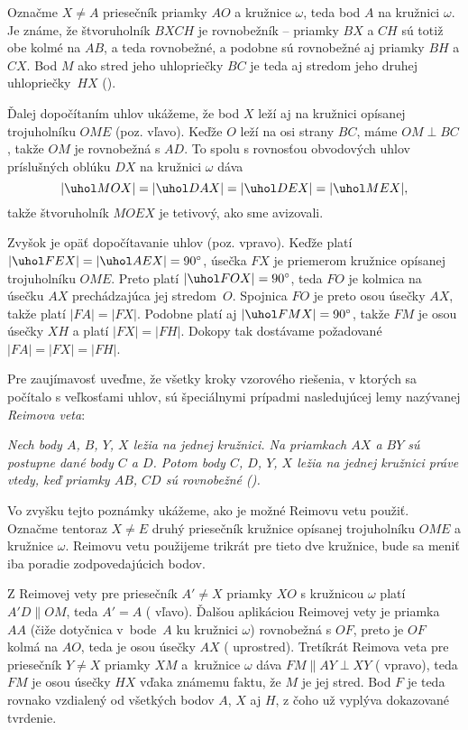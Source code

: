 {%
Označme $X\ne A$ priesečník priamky $AO$ a kružnice $\omega$, teda bod  $A$ na kružnici $\omega$. Je známe, že štvoruholník $BXCH$ je rovnobežník -- priamky $BX$ a $CH$ sú totiž obe kolmé na $AB$, a teda rovnobežné, a podobne sú rovnobežné aj priamky $BH$ a $CX$. Bod $M$ ako stred jeho uhlopriečky $BC$ je teda aj stredom jeho druhej uhlopriečky~$HX$ (\obr).
%

Ďalej dopočítaním uhlov ukážeme, že bod $X$ leží aj na kružnici opísanej trojuholníku $OME$ (poz. \obr{} vľavo). Keďže $O$ leží na osi strany $BC$, máme $OM\perp BC$, takže $OM$ je rovnobežná s $AD$. To spolu s rovnosťou obvodových uhlov príslušných oblúku $DX$ na kružnici $\omega$ dáva
$$|\uhol MOX|=|\uhol DAX|=|\uhol DEX|=|\uhol MEX|,$$
takže štvoruholník $MOEX$ je tetivový, ako sme avizovali.
%

Zvyšok je opäť dopočítavanie uhlov (poz.  vpravo). Keďže platí $|\uhol FEX|=|\uhol AEX|=90^\circ$, úsečka $FX$ je priemerom kružnice opísanej trojuholníku $OME$.
Preto platí $|\uhol FOX|=90^\circ$, teda $FO$ je kolmica na úsečku $AX$ prechádzajúca jej stredom~$O$. Spojnica $FO$ je preto osou úsečky $AX$, takže platí $|FA|=|FX|$.
Podobne platí aj $|\uhol FMX|=90^\circ$, takže $FM$ je osou úsečky $XH$ a platí $|FX|=|FH|$.
Dokopy tak dostávame požadované $|FA|=|FX|=|FH|$.

\poznamka
Pre zaujímavosť uveďme, že všetky kroky vzorového riešenia, v ktorých sa počítalo s veľkosťami uhlov, sú špeciálnymi prípadmi nasledujúcej lemy nazývanej \emph{Reimova veta}:

{\sl\it Nech body $A$, $B$, $Y$, $X$ ležia na jednej kružnici. Na priamkach $AX$ a $BY$ sú postupne dané body $C$ a $D$. Potom body $C$, $D$, $Y$, $X$ ležia na jednej kružnici práve vtedy, keď priamky $AB$, $CD$ sú rovnobežné (\obr).}
%

Vo zvyšku tejto poznámky ukážeme, ako je možné Reimovu vetu použiť. Označme tentoraz $X\ne E$ druhý priesečník kružnice opísanej trojuholníku $OME$ a kružnice $\omega$. Reimovu vetu použijeme trikrát pre tieto dve kružnice, bude sa meniť iba poradie zodpovedajúcich bodov.

Z Reimovej vety pre priesečník $A'\ne X$ priamky $XO$ s kružnicou $\omega$ platí $A'D\parallel OM$, teda $A'=A$ (\obr{} vľavo).
Ďalšou aplikáciou Reimovej vety je priamka $AA$ (čiže dotyčnica v~bode~$A$ ku kružnici $\omega$) rovnobežná s $OF$, preto je $OF$ kolmá na $AO$, teda je osou úsečky $AX$ ( uprostred). Tretíkrát Reimova veta pre priesečník $Y\ne X$ priamky $XM$ a~kružnice $\omega$ dáva $FM\parallel AY\perp XY$ ( vpravo), teda $FM$ je osou úsečky $HX$ vďaka známemu faktu, že $M$ je jej stred. Bod $F$ je teda rovnako vzdialený od všetkých bodov $A$, $X$ aj $H$, z čoho už vyplýva dokazované tvrdenie.
%

}
